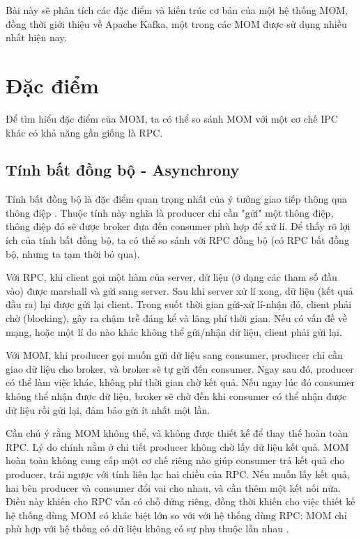 \documentclass{article}
\begin{document}
Bài này sẽ phân tích các đặc điểm và kiến trúc cơ bản của một hệ thống MOM, đồng
thời giới thiệu về Apache Kafka, một trong các MOM được sử dụng nhiều nhất hiện
nay.

\section{Đặc điểm}

Để tìm hiểu đặc điểm của MOM, ta có thể so sánh MOM với một cơ chế IPC khác
có khả năng gần giống là RPC.

\subsection{Tính bất đồng bộ - Asynchrony}

Tính bất đồng bộ là đặc điểm quan trọng nhất của ý tưởng giao tiếp thông qua
thông điệp \cite{inbook}. Thuộc tính này nghĩa là producer chỉ cần "gửi" một
thông điệp, thông điệp đó sẽ được broker đưa đến consumer phù hợp để xử lí. Để
thấy rõ lợi ích của tính bất đồng bộ, ta có thể so sánh với RPC đồng bộ (có RPC
bất đồng bộ, nhưng ta tạm thời bỏ qua).

Với RPC, khi client gọi một hàm của server, dữ liệu (ở dạng các tham số đầu vào)
được marshall và gửi sang server. Sau khi server xử lí xong, dữ liệu (kết quả
đầu ra) lại được gửi lại client. Trong suốt thời gian gửi-xử lí-nhận đó, client
phải chờ (blocking), gây ra chậm trễ đáng kể và lãng phí thời gian. Nếu có vấn
đề về mạng, hoặc một lí do nào khác không thể gửi/nhận dữ liệu, client phải gửi
lại.

Với MOM, khi producer gọi muốn gửi dữ liệu sang consumer, producer chỉ cần
giao dữ liệu cho broker, và broker sẽ tự gửi đến consumer. Ngay sau đó, producer
có thể làm việc khác, không phí thời gian chờ kết quả. Nếu ngay lúc đó consumer
không thể nhận được dữ liệu, broker sẽ chờ đến khi consumer có thể nhận được dữ
liệu rồi gửi lại, đảm bảo gửi ít nhất một lần.

Cần chú ý rằng MOM không thể, và không được thiết kế để thay thế hoàn toàn RPC.
Lý do chính nằm ở chi tiết producer không chờ lấy dữ liệu kết quả. MOM hoàn toàn
không cung cấp một cơ chế riêng nào giúp consumer trả kết quả cho producer, trái
ngược với tính liên lạc hai chiều của RPC. Nếu muốn lấy kết quả, hai bên
producer và consumer đổi vai cho nhau, và cần thêm một kết nối nữa. Điều này
khiến cho RPC vẫn có chỗ đứng riêng, đồng thời khiến cho việc thiết kế hệ thống
dùng MOM có khác biệt lớn so với với hệ thống dùng RPC: MOM chỉ phù hợp với hệ
thống có dữ liệu không có sự phụ thuộc lẫn nhau \cite{ejb3_c4}.
\end{document}
